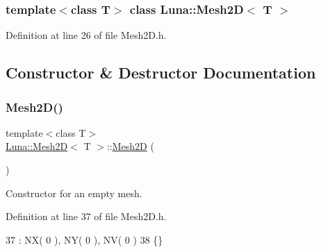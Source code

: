 \subsubsection*{template$<$class T$>$\newline
class Luna\+::\+Mesh2\+D$<$ T $>$}



Definition at line 26 of file Mesh2\+D.\+h.



\subsection{Constructor \& Destructor Documentation}
\mbox{\label{classLuna_1_1Mesh2D_a867e2acbb4c6c23faf04ee6bacd2c300}} 
\subsubsection{\texorpdfstring{Mesh2\+D()}{Mesh2D()}\hspace{0.1cm}{\footnotesize\ttfamily [1/2]}}
{\footnotesize\ttfamily template$<$class T$>$ \\
\hyperlink{classLuna_1_1Mesh2D}{Luna\+::\+Mesh2D}$<$ T $>$\+::\hyperlink{classLuna_1_1Mesh2D}{Mesh2D} (\begin{DoxyParamCaption}{ }\end{DoxyParamCaption})\hspace{0.3cm}{\ttfamily [inline]}}



Constructor for an empty mesh. 



Definition at line 37 of file Mesh2\+D.\+h.


\begin{DoxyCode}
37              : NX( 0 ), NY( 0 ), NV( 0 )
38     \{\}
\end{DoxyCode}
\mbox{\label{classLuna_1_1Mesh2D_ae0b525b986a67e18b0c413d304b011c1}} 
